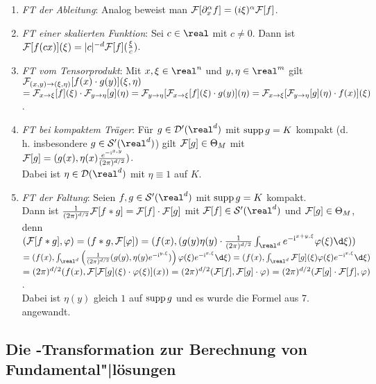 \begin{enumerate}
    \item
    \emph{FT der Ableitung}:
    Analog beweist man $\mathcal{F}[\partial_x^\alpha f] = (i\xi)^\alpha \mathcal{F}[f]$.
    
    \item
    \emph{FT einer skalierten Funktion}:
    Sei $c \in \real$ mit $c \not= 0$.
    Dann ist $\mathcal{F}[f(cx)](\xi) = |c|^{-d} \mathcal{F}[f](\frac{\xi}{c})$.
    
    \item
    \emph{FT vom Tensorprodukt}:
    Mit $x, \xi \in \real^n$ und $y, \eta \in \real^m$ gilt
    $\mathcal{F}_{(x, y) \to (\xi, \eta)}[f(x) \cdot g(y)](\xi, \eta)$\\
    $= \mathcal{F}_{x \to \xi}[f](\xi) \cdot \mathcal{F}_{y \to \eta}[g](\eta) =
    \mathcal{F}_{y \to \eta}[\mathcal{F}_{x \to \xi}[f](\xi) \cdot g(y)](\eta) =
    \mathcal{F}_{x \to \xi}[\mathcal{F}_{y \to \eta}[g](\eta) \cdot f(x)](\xi)$.
    
    \item
    \emph{FT bei kompaktem Träger}:
    Für $g \in \D'(\real^d)$ mit $\operatorname{supp} g = K$ kompakt
    (d.\,h. insbesondere $g \in \S'(\real^d)$) gilt
    $\mathcal{F}[g] \in \Theta_M$ mit
    $\mathcal{F}[g] = (g(x), \eta(x)\frac{e^{-\mathrm{i}\sp{x, y}}}{(2\pi)^{d/2}})$.\\
    Dabei ist $\eta \in \D(\real^d)$ mit $\eta \equiv 1$ auf $K$.
    
    \item
    \emph{FT der Faltung}:
    Seien $f, g \in \S'(\real^d)$ mit $\operatorname{supp} g = K$ kompakt.\\
    Dann ist $\frac{1}{(2\pi)^{d/2}} \mathcal{F}[f \ast g] = \mathcal{F}[f] \cdot \mathcal{F}[g]$
    mit $\F[f] \in \S'(\real^d)$ und $\mathcal{F}[g] \in \Theta_M$, denn\\
    $(\F[f \ast g], \varphi) = (f \ast g, \F[\varphi]) =
    (f(x), (g(y)\eta(y) \cdot \frac{1}{(2\pi)^{d/2}}
    \int_{\real^d} e^{-\i\sp{x + y, \xi}}\varphi(\xi)\d\xi))$\\
    $= (f(x), \int_{\real^d}
    \left(\frac{1}{(2\pi)^{d/2}} (g(y), \eta(y)e^{-\i\sp{y, \xi}})\right)
    \varphi(\xi)e^{-\i\sp{x, \xi}}\d\xi) =
    (f(x), \int_{\real^d} \F[g](\xi)\varphi(\xi)e^{-\i\sp{x, \xi}}\d\xi)$\\
    $= (2\pi)^{d/2} (f(x), \mathcal{F}[\mathcal{F}[g](\xi) \cdot \varphi(\xi)](x)) =
    (2\pi)^{d/2} (\mathcal{F}[f], \mathcal{F}[g] \cdot \varphi) =
    (2\pi)^{d/2} (\mathcal{F}[g] \cdot \mathcal{F}[f], \varphi)$.\\
    Dabei ist $\eta(y)$ gleich $1$ auf $\operatorname{supp} g$ und es wurde die Formel aus
    7. angewandt.
\end{enumerate}

\subsection{%
    Die -Transformation zur Berechnung von Fundamental"|lösungen%
}

